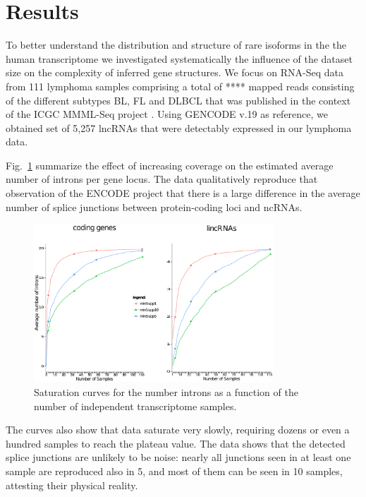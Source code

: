 \documentclass[ncrna,article,submit,moreauthors,pdftex,10pt,a4paper]{mdpi}
\newcommand{\TODO}[1]{\begingroup\color{red}#1\endgroup}
\begin{document}
\section{Results}

To better understand the distribution and structure of rare isoforms in the
the human transcriptome we investigated systematically the influence of the
dataset size on the complexity of inferred gene structures. We focus on
RNA-Seq data from 111 lymphoma samples \TODO{comprising a total of ****
  mapped reads} consisting of the different subtypes BL, FL and DLBCL that
was published in the context of the ICGC MMML-Seq project
\cite{Richter:12a}. Using GENCODE v.19 as reference, we obtained set of
5,257 lncRNAs that were detectably expressed in our lymphoma data.

Fig.~\ref{fig:saturation} summarize the effect of increasing coverage on
the estimated average number of introns per gene locus. The data
qualitatively reproduce that observation of the ENCODE project that there is
a large difference in the average number of splice junctions between
protein-coding loci and ncRNAs. 

\begin{figure}[t]
\begin{center}
  \includegraphics[width=0.8\textwidth]{saturation}
\end{center}
\caption{Saturation curves for the number introns as a function of the 
    number of independent transcriptome samples.}
  \label{fig:saturation} 
\end{figure}

The curves also show that data saturate very slowly, requiring dozens or
even a hundred samples to reach the plateau value. The data shows that the
detected splice junctions are unlikely to be noise: nearly all junctions
seen in at least one sample are reproduced also in 5, and most of them can
be seen in 10 samples, attesting their physical reality. 
\end{document}

